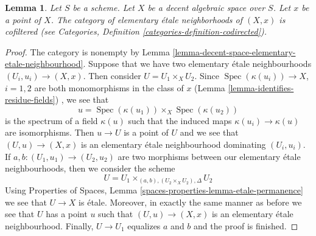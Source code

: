 \documentclass{stacks-project}
\theoremstyle{plain}
\newtheorem{lemma}[subsection]{Lemma}
\theoremstyle{definition}
\theoremstyle{remark}
\numberwithin{equation}{subsection}
\def\Spec{\mathop{\mathrm{Spec}}}
\begin{document}
\begin{lemma}
\label{lemma-elementary-etale-neighbourhoods}
Let $S$ be a scheme. Let $X$ be a decent algebraic space over $S$.
Let $x$ be a point of $X$.
The category of elementary \'etale neighborhoods of $(X, x)$
is cofiltered (see
Categories, Definition \ref{categories-definition-codirected}).
\end{lemma}

\begin{proof}
The category is nonempty by
Lemma \ref{lemma-decent-space-elementary-etale-neighbourhood}.
Suppose that we have two elementary \'etale neighbourhoods
$(U_i, u_i) \to (X, x)$.
Then consider $U = U_1 \times_X U_2$. Since
$\Spec(\kappa(u_i)) \to X$, $i = 1, 2$ are both monomorphisms
in the class of $x$ (Lemma \ref{lemma-identifies-residue-fields})
, we see that
$$
u = \Spec(\kappa(u_1)) \times_X \Spec(\kappa(u_2))
$$
is the spectrum of a field $\kappa(u)$ such that the induced maps
$\kappa(u_i) \to \kappa(u)$ are isomorphisms. Then $u \to U$ is a point
of $U$ and we see that $(U, u) \to (X, x)$ is an elementary
\'etale neighbourhood dominating $(U_i, u_i)$.
If $a, b : (U_1, u_1) \to (U_2, u_2)$ are two morphisms between
our elementary \'etale neighbourhoods, then we consider the scheme
$$
U = U_1 \times_{(a, b), (U_2 \times_X U_2), \Delta} U_2
$$
Using Properties of Spaces, Lemma
\ref{spaces-properties-lemma-etale-permanence}
we see that $U \to X$ is \'etale. Moreover, in exactly the same manner
as before we see that $U$ has a point $u$
such that $(U, u) \to (X, x)$ is an elementary
\'etale neighbourhood. Finally, $U \to U_1$ equalizes $a$ and $b$
and the proof is finished.
\end{proof}
\end{document}
